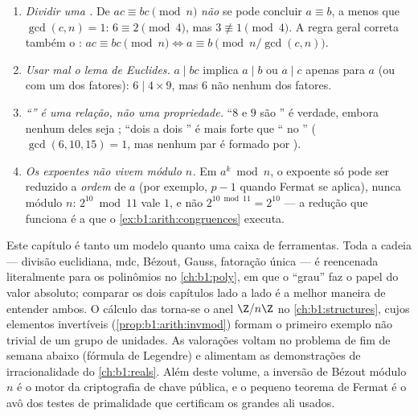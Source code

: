 \begin{remark}\label{rem:b1:arith:pitfalls}
\begin{enumerate}
  \item \emph{Dividir uma .} De $ac \equiv bc \pmod n$
        \emph{não} se pode concluir $a \equiv b$, a menos que $\gcd(c,
        n) = 1$: $6 \equiv 2 \pmod 4$, mas $3 \not\equiv 1 \pmod
        4$. A regra geral correta  também o : $ac
        \equiv bc \pmod n \iff a \equiv b \pmod{n/\gcd(c,n)}$.
  \item \emph{Usar mal o lema de Euclides.} $a \mid bc$ implica $a
        \mid b$ ou $a \mid c$ apenas para $a$ \emph{} (ou
         com um dos fatores): $6 \mid 4 \times 9$, mas $6$
        não  nenhum dos fatores.
  \item \emph{``'' é uma relação, não uma propriedade.}
        ``$8$ e $9$ são '' é verdade, embora nenhum
        deles seja ; ``dois a dois '' é mais forte
        que `` no '' ($\gcd(6, 10, 15) = 1$, mas
        nenhum par é formado por ).
  \item \emph{Os expoentes não vivem módulo $n$.} Em $a^k \bmod n$,
        o expoente só pode ser reduzido  a \emph{ordem}
        de $a$ (por exemplo, $p - 1$ quando Fermat se aplica), nunca
        módulo $n$: $2^{10} \bmod 11$ vale $1$, e não $2^{10 \bmod
        11} = 2^{10}$ --- a redução que funciona é a que o
        \cref{ex:b1:arith:congruences} executa.
\end{enumerate}
\end{remark}

\begin{remark}\label{rem:b1:arith:whereused}
Este capítulo é tanto um modelo quanto uma caixa de ferramentas. Toda a
cadeia --- divisão euclidiana, mdc, Bézout, Gauss, fatoração única ---
é reencenada literalmente para os polinômios no \cref{ch:b1:poly},
em que o ``grau'' faz o papel do valor absoluto; comparar os
dois capítulos lado a lado é a melhor maneira de entender ambos. O
cálculo das  torna-se o anel $\Z/n\Z$ no
\cref{ch:b1:structures}, cujos elementos invertíveis
(\cref{prop:b1:arith:invmod}) formam o primeiro exemplo não trivial de
um grupo de unidades. As valorações voltam no problema de fim de semana
abaixo (fórmula de Legendre) e alimentam as demonstrações de
irracionalidade do \cref{ch:b1:reals}. Além deste volume, a inversão de
Bézout módulo $n$ é o motor da criptografia de chave pública, e o
pequeno teorema de Fermat é o avô dos testes de primalidade que
certificam os grandes  ali usados.
\end{remark}

